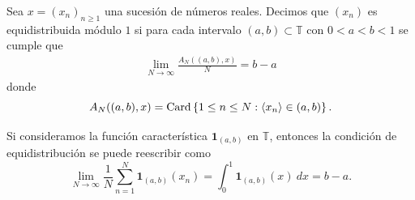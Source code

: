 \begin{definition}
    Sea $x=(x_n)_{n\geq1}$ una sucesión de números reales. Decimos que $(x_n)$ es
    equidistribuida módulo $1$ si para cada
    intervalo $(a,b) \subset \mathbb{T}$ con $0 < a < b < 1$ se cumple que
    \begin{align}
        \label{def:equidistribucion}
        \lim_{N\to\infty} \frac{A_N((a,b), x)}{N} = b-a
    \end{align}
    donde 
    \[
        A_N((a,b), x) = \operatorname{Card} \left\{1\le n\le N : \langle x_n \rangle \in (a,b)\right\}.
    \]
\end{definition}

\begin{remark}
    \label{obs:equidistribucion}
    Si consideramos la función característica $\mathbf{1}_{(a,b)}$ en $\mathbb{T}$, entonces la
    condición de equidistribución se puede reescribir como
    \[
        \lim_{N\to\infty} \frac{1}{N} \sum_{n=1}^N \mathbf{1}_{(a,b)}(x_n) =
        \int_0^1 \mathbf{1}_{(a,b)}(x)\ dx = 
        b-a.
    \]
\end{remark}